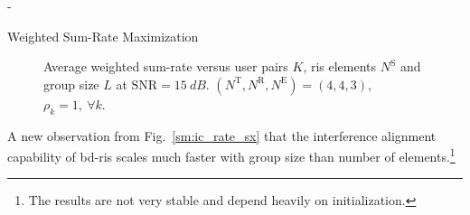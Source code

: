\documentclass[journal]{IEEEtran}
\begin{document}
\begin{section}{-}
\begin{subsection}{Weighted Sum-Rate Maximization}
		\begin{figure}[!t]
			\centering
			\resizebox{0.65\columnwidth}{!}{
				
			}
			\caption{Average weighted sum-rate versus user pairs $K$, \gls{ris} elements $N^\mathrm{S}$ and group size $L$ at $\mathrm{SNR} = \qty{15}{dB}$. $(N^\mathrm{T}, N^\mathrm{R}, N^\mathrm{E}) = (4, 4, 3)$, $\rho_k = 1, \ \forall k$.}
			\label{sm:ic_rate_user}
		\end{figure}

		A new observation from Fig.~\ref{sm:ic_rate_sx} that the interference alignment capability of \gls{bd}-\gls{ris} scales much faster with group size than number of elements.\footnote{The results are not very stable and depend heavily on initialization.}
	\end{subsection}
\end{section}




\end{document}
